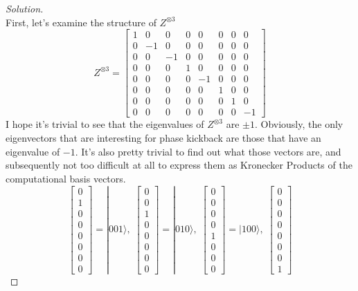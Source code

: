 \documentclass[12pt]{article}
\begin{document}
\begin{proof}[Solution]~\\
First, let's examine the structure of $Z^{\otimes3}$ 
$$Z^{\otimes3}=\begin{bmatrix}
1 &0&0&0&0&0&0&0\\
0&-1&0&0&0&0&0&0\\
0&0&-1&0&0&0&0&0\\
0&0&0 &1&0&0&0&0\\
0&0&0&0&-1&0&0&0\\
0&0&0&0&0& 1&0&0\\
0&0&0&0&0&0& 1&0\\
0&0&0&0&0&0&0&-1
\end{bmatrix}$$
I hope it's trivial to see that the eigenvalues of $Z^{\otimes3}$ are $\pm1$. Obviously, the only eigenvectors that are interesting for phase kickback are those that have an eigenvalue of $-1$. It's also pretty trivial to find out what those vectors are, and subsequently not too difficult at all to express them as Kronecker Products of the computational basis vectors.
$$\begin{bmatrix}
0\\
1\\
0\\0\\0\\0\\0\\0
\end{bmatrix}=|001\rangle,\;\begin{bmatrix}
0\\
0\\
1\\0\\0\\0\\0\\0
\end{bmatrix}=|010\rangle,\;\begin{bmatrix}
0\\
0\\
0\\0\\1\\0\\0\\0
\end{bmatrix}=|100\rangle,\;\begin{bmatrix}
0\\
0\\
0\\0\\0\\0\\0\\1

\end{bmatrix}$$
\end{proof}
\end{document}
